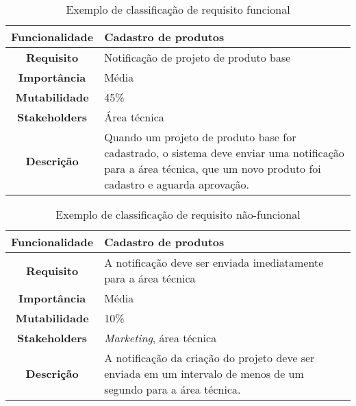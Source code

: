       \begin{table}[h!]
        \centering
        \begin{tabular}{|c|p{10cm}|}
          \hline
          \textbf{Funcionalidade} &
          Cadastro de produtos \\ \hline
          \textbf{Requisito} &
          Notificação de projeto de produto base \\ \hline
          \textbf{Importância} &
          Média \\ \hline
          \textbf{Mutabilidade} &
          45\% \\ \hline
          \textbf{Stakeholders} &
          Área técnica \\ \hline
          \textbf{Descrição} &
          Quando um projeto de produto base for cadastrado, o sistema deve
          enviar uma notificação para a área técnica, que um novo produto
          foi cadastro e aguarda aprovação. \\ \hline
        \end{tabular}
        \caption{Exemplo de classificação de requisito funcional}
        \label{Tabela:5}
      \end{table}

      \begin{table}[h!]
        \centering
        \begin{tabular}{|c|p{10cm}|}
          \hline
          \textbf{Funcionalidade} &
          Cadastro de produtos \\ \hline
          \textbf{Requisito} &
          A notificação deve ser enviada imediatamente para a área técnica \\ \hline
          \textbf{Importância} &
          Média \\ \hline
          \textbf{Mutabilidade} &
          10\% \\ \hline
          \textbf{Stakeholders} &
          \textit{Marketing}, área técnica \\ \hline
          \textbf{Descrição} &
          A notificação da criação do projeto deve ser enviada em um intervalo de
          menos de um segundo para a área técnica. \\ \hline
        \end{tabular}
        \caption{Exemplo de classificação de requisito não-funcional}
        \label{Tabela:6}
      \end{table}

